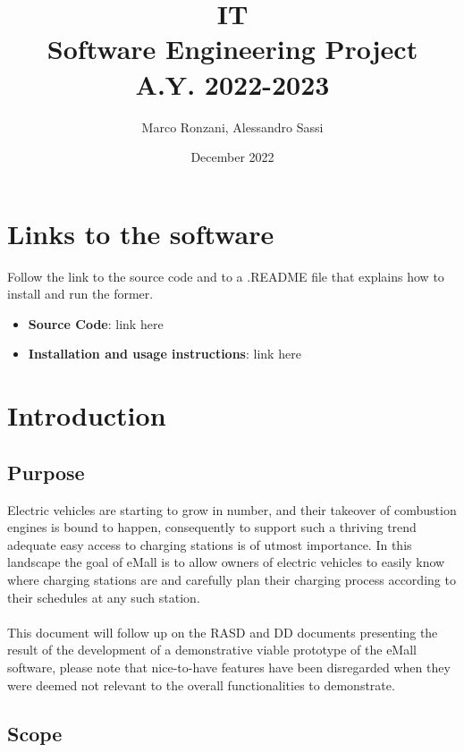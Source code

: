 \documentclass[11pt]{article}
\title{%
  \textbf{IT} \\
  \large Software Engineering Project \\ A.Y. 2022-2023}
\author{Marco Ronzani, Alessandro Sassi}
\date{December 2022}
\begin{document}
\maketitle

\doublespacing
\tableofcontents
\singlespacing

\newpage

\section{Links to the software}

Follow the link to the source code and to a .README file that explains how to install and run the former.
\begin{itemize}
    \item \textbf{Source Code}: link here
    \item \textbf{Installation and usage instructions}: link here
\end{itemize}

\section{Introduction}
\label{section:introduction}

\subsection{Purpose}

Electric vehicles are starting to grow in number, and their takeover of combustion engines is bound to happen, consequently to support such a thriving trend adequate easy access to charging stations is of utmost importance. In this landscape the goal of eMall is to allow owners of electric vehicles to easily know where charging stations are and carefully plan their charging process according to their schedules at any such station. \\
\\
This document will follow up on the RASD and DD documents presenting the result of the development of a demonstrative viable prototype of the eMall software, please note that nice-to-have features have been disregarded when they were deemed not relevant to the overall functionalities to demonstrate. \\

\subsection{Scope}
\end{document}
